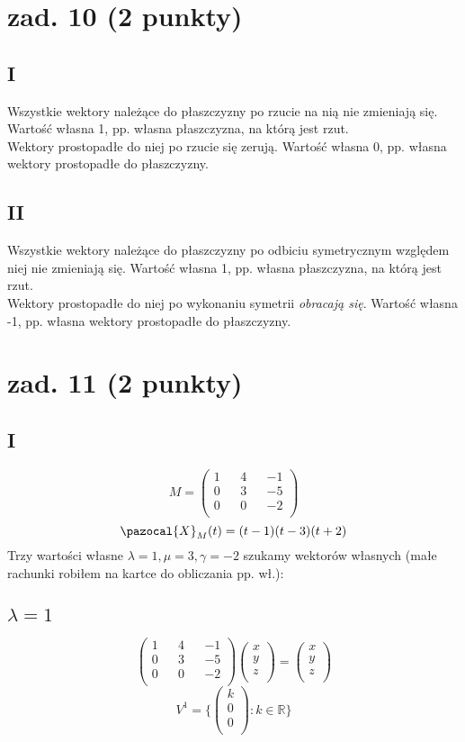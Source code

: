 \documentclass{article}
\begin{document}
\section{zad. 10 (2 punkty)}
\subsection*{I}
Wszystkie wektory należące do płaszczyzny po rzucie na nią nie zmieniają się. Wartość własna 1, pp. własna płaszczyzna, na którą jest rzut.\\
Wektory prostopadłe do niej po rzucie się zerują. Wartość własna 0, pp. własna wektory prostopadłe do płaszczyzny.
\subsection*{II}
Wszystkie wektory należące do płaszczyzny po odbiciu symetrycznym względem niej nie zmieniają się. Wartość własna 1, pp. własna płaszczyzna, na którą jest rzut.\\
Wektory prostopadłe do niej po wykonaniu symetrii \textit{obracają się}. Wartość własna -1, pp. własna wektory prostopadłe do płaszczyzny.
\section{zad. 11 (2 punkty)}
\subsection*{I}
$$M =
\begin{pmatrix}
1 && 4 && -1\\
0 && 3 && -5\\
0 && 0 && -2\\
\end{pmatrix}
$$
$$
\pazocal{X}_M(t) =(t-1)(t-3)(t+2)
$$
Trzy wartości własne $\lambda = 1, \mu = 3, \gamma = -2$ szukamy wektorów własnych (małe rachunki robiłem na kartce do obliczania pp. wł.):
\subsection*{$\lambda = 1$}
$$
\begin{pmatrix}
1 && 4 && -1\\
0 && 3 && -5\\
0 && 0 && -2\\
\end{pmatrix}
\begin{pmatrix}
x\\
y\\
z\\
\end{pmatrix} =
\begin{pmatrix}
x\\
y\\
z\\
\end{pmatrix}
$$
$$
V^{1} = \{\begin{pmatrix}
k\\
0\\
0\\
\end{pmatrix} : k \in \mathbb{R}\}
$$ 
\end{document}
